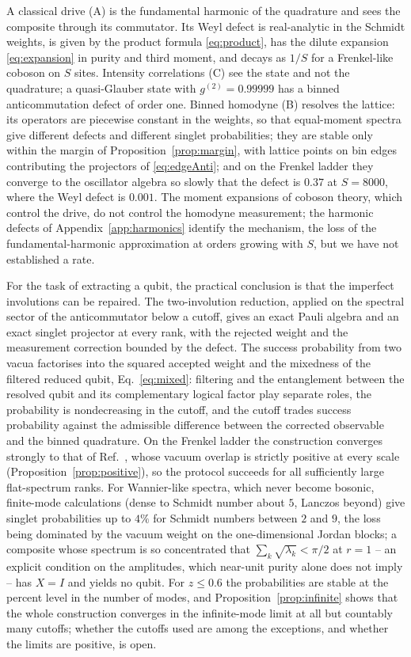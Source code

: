 \documentclass[11pt,a4paper]{article}
\begin{document}
A classical drive (A) is the fundamental harmonic of the quadrature and sees the composite through its commutator. Its Weyl defect is real-analytic in the Schmidt weights, is given by the product formula \eqref{eq:product}, has the dilute expansion \eqref{eq:expansion} in purity and third moment, and decays as $1/S$ for a Frenkel-like coboson on $S$ sites. Intensity correlations (C) see the state and not the quadrature; a quasi-Glauber state with $g^{(2)}=0.99999$ has a binned anticommutation defect of order one. Binned homodyne (B) resolves the lattice: its operators are piecewise constant in the weights, so that equal-moment spectra give different defects and different singlet probabilities; they are stable only within the margin of Proposition~\ref{prop:margin}, with lattice points on bin edges contributing the projectors of \eqref{eq:edgeAnti}; and on the Frenkel ladder they converge to the oscillator algebra so slowly that the defect is $0.37$ at $S=8000$, where the Weyl defect is $0.001$. The moment expansions of coboson theory, which control the drive, do not control the homodyne measurement; the harmonic defects of Appendix~\ref{app:harmonics} identify the mechanism, the loss of the fundamental-harmonic approximation at orders growing with $S$, but we have not established a rate.

For the task of extracting a qubit, the practical conclusion is that the imperfect involutions can be repaired. The two-involution reduction, applied on the spectral sector of the anticommutator below a cutoff, gives an exact Pauli algebra and an exact singlet projector at every rank, with the rejected weight and the measurement correction bounded by the defect. The success probability from two vacua factorises into the squared accepted weight and the mixedness of the filtered reduced qubit, Eq.~\eqref{eq:mixed}: filtering and the entanglement between the resolved qubit and its complementary logical factor play separate roles, the probability is nondecreasing in the cutoff, and the cutoff trades success probability against the admissible difference between the corrected observable and the binned quadrature. On the Frenkel ladder the construction converges strongly to that of Ref.~\cite{Sorella2026}, whose vacuum overlap is strictly positive at every scale (Proposition~\ref{prop:positive}), so the protocol succeeds for all sufficiently large flat-spectrum ranks. For Wannier-like spectra, which never become bosonic, finite-mode calculations (dense to Schmidt number about $5$, Lanczos beyond) give singlet probabilities up to $4\%$ for Schmidt numbers between $2$ and $9$, the loss being dominated by the vacuum weight on the one-dimensional Jordan blocks; a composite whose spectrum is so concentrated that $\sum_k\sqrt{\lambda_k}<\pi/2$ at $r=1$ -- an explicit condition on the amplitudes, which near-unit purity alone does not imply -- has $X=I$ and yields no qubit. For $z\le0.6$ the probabilities are stable at the percent level in the number of modes, and Proposition~\ref{prop:infinite} shows that the whole construction converges in the infinite-mode limit at all but countably many cutoffs; whether the cutoffs used are among the exceptions, and whether the limits are positive, is open.
\end{document}
